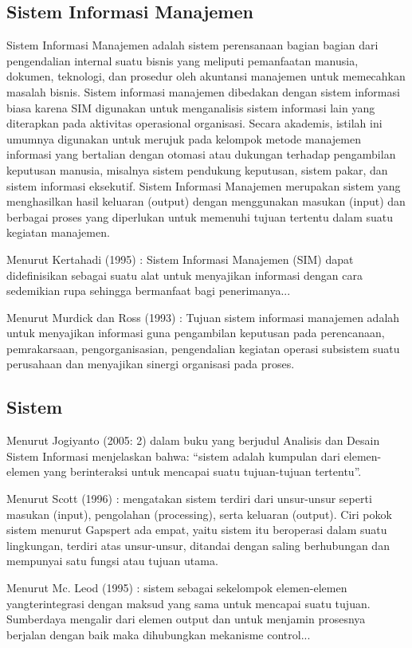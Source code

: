 \documentclass{jtetiproposalskripsi}
\begin{document}
\subsection{Sistem Informasi Manajemen }
Sistem Informasi Manajemen adalah sistem perensanaan bagian bagian dari pengendalian internal suatu bisnis yang meliputi pemanfaatan manusia, dokumen, teknologi, dan prosedur oleh akuntansi manajemen untuk memecahkan masalah bisnis. Sistem informasi manajemen dibedakan dengan sistem informasi biasa karena SIM digunakan untuk menganalisis sistem informasi lain yang diterapkan pada aktivitas operasional organisasi. Secara akademis, istilah ini umumnya digunakan untuk merujuk pada kelompok metode manajemen informasi yang bertalian dengan otomasi atau dukungan terhadap pengambilan keputusan manusia, misalnya sistem pendukung keputusan, sistem pakar, dan sistem informasi eksekutif. Sistem Informasi Manajemen merupakan sistem yang menghasilkan hasil keluaran (output) dengan menggunakan masukan (input) dan berbagai proses yang diperlukan untuk memenuhi tujuan tertentu dalam suatu kegiatan manajemen.

Menurut Kertahadi (1995) : Sistem Informasi Manajemen (SIM) dapat didefinisikan sebagai suatu alat untuk menyajikan informasi dengan cara sedemikian rupa sehingga bermanfaat bagi penerimanya...
	
Menurut Murdick dan Ross  (1993) : Tujuan sistem informasi manajemen adalah untuk menyajikan informasi guna pengambilan keputusan pada perencanaan, pemrakarsaan, pengorganisasian, pengendalian kegiatan operasi subsistem suatu perusahaan dan menyajikan sinergi organisasi pada proses.

\subsection{Sistem}
Menurut Jogiyanto (2005: 2) dalam buku yang berjudul Analisis dan Desain Sistem Informasi menjelaskan bahwa: “sistem adalah kumpulan dari elemen-elemen yang berinteraksi untuk mencapai suatu tujuan-tujuan tertentu”.

Menurut Scott (1996) : mengatakan sistem terdiri dari unsur-unsur seperti masukan (input), pengolahan (processing), serta keluaran (output). Ciri pokok sistem menurut Gapspert ada empat, yaitu sistem itu beroperasi dalam suatu lingkungan, terdiri atas unsur-unsur, ditandai dengan saling berhubungan dan mempunyai satu fungsi atau tujuan utama.

Menurut Mc. Leod (1995) : sistem sebagai sekelompok elemen-elemen yangterintegrasi dengan maksud yang sama untuk mencapai suatu tujuan. Sumberdaya mengalir dari elemen output dan untuk menjamin prosesnya berjalan dengan baik maka dihubungkan mekanisme control...
\end{document}
